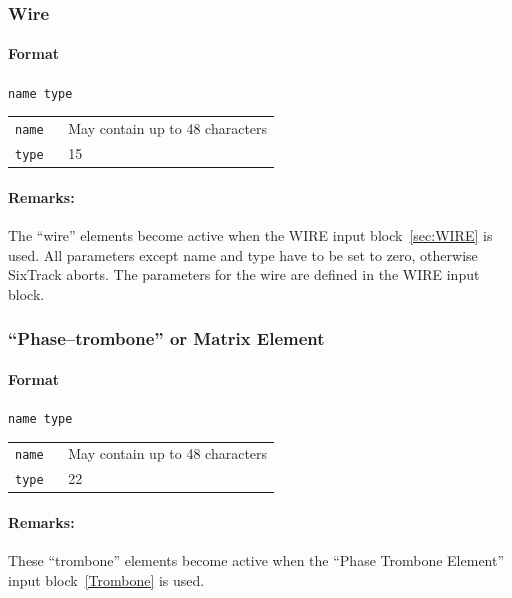 \subsubsection{Wire} \label{WIRE}

\paragraph{Format} \texttt{name type}

\bigskip
\begin{tabular}{@{}lp{0.8\linewidth}}
    \texttt{name} & May contain up to 48 characters \\
    \texttt{type} & 15
\end{tabular}

\paragraph{Remarks:}
The ``wire'' elements become active when the WIRE input block~\ref{sec:WIRE} is used.
All parameters except name and type have to be set to zero, otherwise SixTrack aborts. The parameters for the wire are defined in the WIRE input block.

\subsubsection{``Phase--trombone'' or Matrix Element} \label{PT}

\paragraph{Format} \texttt{name type}

\bigskip
\begin{tabular}{@{}lp{0.8\linewidth}}
    \texttt{name} & May contain up to 48 characters \\
    \texttt{type} & 22
\end{tabular}

\paragraph{Remarks:}
These ``trombone'' elements become active when the ``Phase Trombone Element'' input block~\ref{Trombone} is used.

